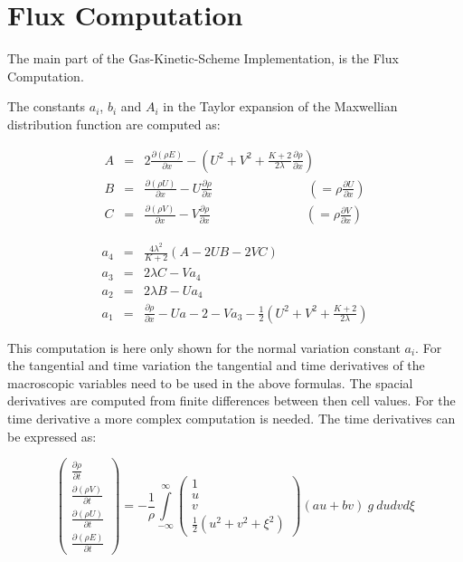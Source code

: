 \documentclass[
	pdftex,             %
	12pt,				%
	a4paper,		   	%
	german,				%
	oneside,			%
]{article}
\begin{document}
\section{Flux Computation}

The main part of the Gas-Kinetic-Scheme Implementation, is the Flux Computation.

The constants $a_i$, $b_i$ and $A_i$ in the Taylor expansion of the Maxwellian distribution function are computed as:

\begin{eqnarray}
A &=& 2 \frac{\partial (\rho E)}{\partial x} 
  - ( U^2 + V^2 + \frac{K+2}{2\lambda} \frac{\partial\rho}{\partial x} )
\\
B &=& \frac{\partial (\rho U)}{\partial x} - U\frac{\partial \rho}{\partial x}
	~~~~~~~~~~~~~~~~~~~~~~~~~~~~~~~~~~\left( = \rho \frac{\partial U}{\partial x} \right)
\\
C &=& \frac{\partial (\rho V)}{\partial x} - V\frac{\partial \rho}{\partial x}
	~~~~~~~~~~~~~~~~~~~~~~~~~~~~~~~~~~\left( = \rho \frac{\partial V}{\partial x} \right)
\end{eqnarray}

\begin{eqnarray}
a_4 &=& \frac{4 \lambda^2}{K+2} ( A - 2 U B - 2 V C )
\\
a_3 &=& 2 \lambda C - V a_4
\\
a_2 &=& 2 \lambda B - U a_4
\\
a_1 &=& \frac{\partial \rho}{\partial x} - U a-2 - V a_3 - \frac{1}{2} \left( U^2 + V^2 + \frac{K+2}{2\lambda} \right)
\end{eqnarray}

This computation is here only shown for the normal variation constant $a_i$. For the tangential and time variation the tangential and time derivatives of the macroscopic variables need to be used in the above formulas. The spacial derivatives are computed from finite differences between then cell values. For the time derivative a more complex computation is needed. The time derivatives can be expressed as:

\begin{equation}
\begin{pmatrix}
	\frac{\partial \rho    }{\partial t} \\
	\frac{\partial (\rho V)}{\partial t} \\
	\frac{\partial (\rho U)}{\partial t} \\
	\frac{\partial (\rho E)}{\partial t}
\end{pmatrix}
 =
 -\frac{1}{\rho}
\int \limits^{\infty}_{-\infty}
\begin{pmatrix}
	1 \\
	u \\
	v \\
	\frac{1}{2} ( u^2 + v^2 + \xi^2 )
\end{pmatrix}
(a u + b v) ~g~
du dv d\xi
\end{equation}
\end{document}
